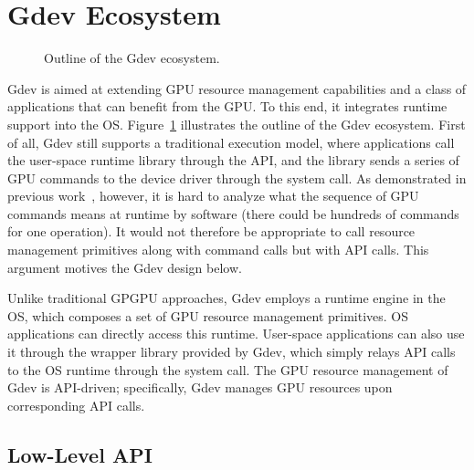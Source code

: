 \section{Gdev Ecosystem}
\label{sec:overview}

\begin{figure}[t]
 \begin{center}
  \caption{Outline of the Gdev ecosystem.}
  \label{fig:gdev}
 \end{center}
 \vspace{-1em}
\end{figure}

Gdev is aimed at extending GPU resource management capabilities and a
class of applications that can benefit from the GPU.
To this end, it integrates runtime support into the OS.
Figure~\ref{fig:gdev} illustrates the outline of the Gdev ecosystem.
First of all, Gdev still supports a traditional execution model, where
applications call the user-space runtime library through the API, and
the library sends a series of GPU commands to the device driver through
the system call.
As demonstrated in previous work~\cite{Kato_ATC11}, however, it is hard
to analyze what the sequence of GPU commands means at runtime by
software (there could be hundreds of commands for one operation).
It would not therefore be appropriate to call resource management
primitives along with command calls but with API calls.
This argument motives the Gdev design below.

Unlike traditional GPGPU approaches, Gdev employs a runtime engine in
the OS, which composes a set of GPU resource management primitives.
OS applications can directly access this runtime.
User-space applications can also use it through the wrapper library provided by
Gdev, which simply relays API calls to the OS runtime through the system
call.
The GPU resource management of Gdev is API-driven; specifically, Gdev
manages GPU resources upon corresponding API calls.

\subsection{Low-Level API}
\label{sec:low_level_api}

